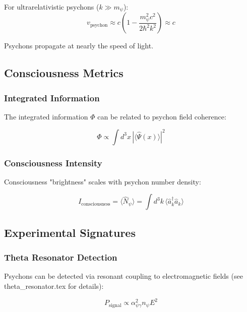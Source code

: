 For ultrarelativistic psychons ($k \gg m_\psi$):
\begin{equation}
v_{\text{psychon}} \approx c \left(1 - \frac{m_\psi^2 c^2}{2\hbar^2 k^2}\right) \approx c
\end{equation}

Psychons propagate at nearly the speed of light.

\subsection{Consciousness Metrics}

\subsubsection{Integrated Information}

The integrated information $\Phi$ can be related to psychon field coherence:

\begin{equation}
\Phi \propto \int d^3x \, |\langle \hat{\Psi}(x) \rangle|^2
\end{equation}

\subsubsection{Consciousness Intensity}

Consciousness "brightness" scales with psychon number density:

\begin{equation}
I_{\text{consciousness}} = \langle \hat{N}_\psi \rangle = \int d^3k \, \langle \hat{a}_k^\dagger \hat{a}_k \rangle
\end{equation}

\subsection{Experimental Signatures}

\subsubsection{Theta Resonator Detection}

Psychons can be detected via resonant coupling to electromagnetic fields (see theta_resonator.tex for details):

\begin{equation}
P_{\text{signal}} \propto \alpha_{\psi\gamma}^2 n_\psi E^2
\end{equation}

